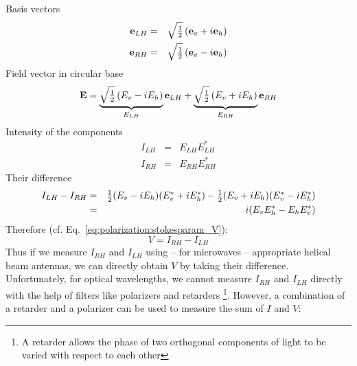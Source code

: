 Basis vectors
\begin{eqnarray}
  \label{eq:polarization:e_Lh}
  \mathbf{e}_{LH} &=& \sqrt{\textstyle\frac{1}{2}} \left( \mathbf{e}_v + i\mathbf{e}_h \right) \\
  \label{eq:polarization:e_Rh}
  \mathbf{e}_{RH} &=& \sqrt{\textstyle\frac{1}{2}} \left( \mathbf{e}_v - i\mathbf{e}_h \right) 
\end{eqnarray}
%
Field vector in circular base
\begin{equation}
  \label{eq:polarization:E_circbase}
  \mathbf{E} = \underbrace{
               \sqrt{\textstyle\frac{1}{2}}\left(E_v -  i E_h \right)}_{E_{LH}} 
               \mathbf{e}_{LH} 
              + \underbrace{
               \sqrt{\textstyle\frac{1}{2}}\left(E_v +  i E_h \right)}_{E_{RH}} 
               \mathbf{e}_{RH} 
\end{equation}
%
Intensity of the components
\begin{eqnarray}
  \label{eq:polarization:ILH}
  I_{LH} &=& E_{LH} E_{LH}^\ast\\
  \label{eq:polarization:IRH}
  I_{RH} &=& E_{RH} E_{RH}^\ast
\end{eqnarray}
%
Their difference
\begin{eqnarray}
   I_{LH} -  I_{RH}
   &=&
     \textstyle\frac{1}{2} (E_v - i E_h) (E_v^\ast + i E_h^\ast)
    - \textstyle\frac{1}{2} (E_v + i E_h) (E_v^\ast - i E_h^\ast)\\ \nonumber
   &=&
   i (E_v E_h^\ast -  E_h E_v^\ast)
  \label{eq:polarization:Idiff_circbase}
\end{eqnarray}
Therefore (cf. Eq.~\ref{eq:polarization:stokesparam_V}):
\begin{equation}
  \label{eq:polarization:V_Idiff}
  V =   I_{RH} -  I_{LH}
\end{equation}
%
Thus if we measure $I_{RH}$ and $I_{LH}$ using -- for microwaves --
appropriate helical beam antennas, we can directly obtain $V$ by
taking their difference.  Unfortunately, for optical wavelengths, we
cannot measure $I_{RH}$ and $I_{LH}$ directly with the help of
filters like  polarizers and retarders%
\footnote{A retarder allows the phase of two orthogonal components 
of light to be varied  with respect to each other}.  
However, a combination of a retarder and a polarizer can be used
to measure the sum of $I$ and $V$:

